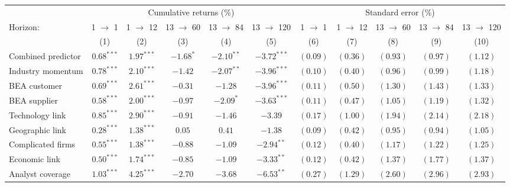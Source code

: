 \documentclass[
]{article}
\begin{document}
\begin{tabular}{lcccccccccc}
   \toprule & \multicolumn{5}{c}{Cumulative returns (\%)} & \multicolumn{5}{c}{Standard error (\%)} \\
 \cmidrule(l){2-6} \cmidrule(l){7-11}Horizon: & 1 $\rightarrow$ 1 & 1 $\rightarrow$ 12 & 13 $\rightarrow$ 60 & 13 $\rightarrow$ 84 & 13 $\rightarrow$ 120 & 1 $\rightarrow$ 1 & 1 $\rightarrow$ 12 & 13 $\rightarrow$ 60 & 13 $\rightarrow$ 84 & 13 $\rightarrow$ 120 \\ 
   \cmidrule(l){2-6} \cmidrule(l){7-11} \vspace{5pt} & (1) & (2) & (3) & (4) & (5) & (6) & (7) & (8) & (9) & (10) \\ 
   \vspace{5pt}Combined predictor & $0.68^{***}$ & $1.97^{***}$ & $-1.68^{*}$ & $-2.10^{**}$ & $-3.72^{***}$ & $(0.09)$ & $(0.36)$ & $(0.93)$ & $(0.97)$ & $(1.12)$ \\ 
  Industry momentum & $0.78^{***}$ & $2.10^{***}$ & $-1.42$ & $-2.07^{**}$ & $-3.96^{***}$ & $(0.10)$ & $(0.40)$ & $(0.96)$ & $(0.99)$ & $(1.18)$ \\ 
  BEA customer & $0.69^{***}$ & $2.61^{***}$ & $-0.31$ & $-1.28$ & $-3.96^{***}$ & $(0.11)$ & $(0.50)$ & $(1.30)$ & $(1.43)$ & $(1.33)$ \\ 
  BEA supplier & $0.58^{***}$ & $2.00^{***}$ & $-0.97$ & $-2.09^{*}$ & $-3.63^{***}$ & $(0.11)$ & $(0.47)$ & $(1.05)$ & $(1.19)$ & $(1.32)$ \\ 
  Technology link & $0.85^{***}$ & $2.90^{***}$ & $-0.91$ & $-1.46$ & $-3.39$ & $(0.17)$ & $(1.00)$ & $(1.94)$ & $(2.14)$ & $(2.18)$ \\ 
  Geographic link & $0.28^{***}$ & $1.38^{***}$ & $0.05$ & $0.41$ & $-1.38$ & $(0.09)$ & $(0.42)$ & $(0.95)$ & $(0.94)$ & $(1.05)$ \\ 
  Complicated firms & $0.55^{***}$ & $1.38^{***}$ & $-0.88$ & $-1.09$ & $-2.94^{**}$ & $(0.12)$ & $(0.40)$ & $(1.17)$ & $(1.22)$ & $(1.25)$ \\ 
  Economic link & $0.50^{***}$ & $1.74^{***}$ & $-0.85$ & $-1.09$ & $-3.33^{**}$ & $(0.12)$ & $(0.42)$ & $(1.37)$ & $(1.77)$ & $(1.37)$ \\ 
  Analyst coverage & $1.03^{***}$ & $4.25^{***}$ & $-2.70$ & $-3.68$ & $-6.53^{**}$ & $(0.27)$ & $(1.29)$ & $(2.60)$ & $(2.96)$ & $(2.93)$ \\ 
   \bottomrule 
\end{tabular}
\end{document}
